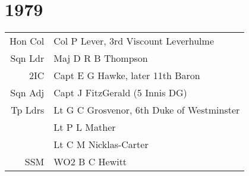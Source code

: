 \chapter*{1979}

\begin{center}
  \small
  \begin{tabular}{rl}
    Hon Col & Col P Lever, 3rd Viscount Leverhulme \\
    Sqn Ldr & Maj D R B Thompson \\
    2IC & Capt E G Hawke, later 11th Baron \\
    Sqn Adj & Capt J FitzGerald (5 Innis DG) \\
    Tp Ldrs & Lt G C Grosvenor, 6th Duke of Westminster \\
      & Lt P L Mather \\
      & Lt C M Nicklas-Carter \\
    SSM & WO2 B C Hewitt \\
  \end{tabular}
\end{center}

